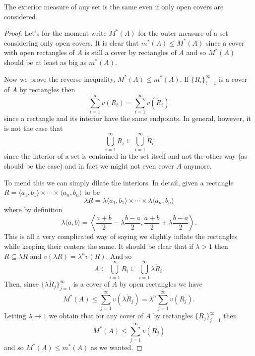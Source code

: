 \documentclass[12pt,oneside]{book}
\numberwithin{table}{section}
\numberwithin{equation}{section}
\numberwithin{figure}{section}
\newcommand{\ext}[1]{m^* \! \left( #1 \right)}
\begin{document}
\begin{lemma} \label{lemma:exterior measure with open sets}
	The exterior measure of any set is the same even if only open covers are considered.
\end{lemma}
\begin{proof}
	Let's for the moment write \( M^*(A) \) for the outer measure of a set considering only open covers. It is clear that \( \ext{A} \leq M^*(A) \) since a cover with open rectangles of \( A \) is still a cover by rectangles of \( A \) and so \( M^\ast(A) \) should be at least as big as \( \ext{A} \).

	Now we prove the reverse inequality, \( M^\ast(A) \leq \ext{A} \). If \( \{ R_i \}_{i = 1}^{\infty} \) is a cover of \( A \) by rectangles then
	\begin{equation*}
		\sum_{i = 1}^{\infty} v(R_i) = \sum_{i = 1}^{\infty} v(\mathring{R}_i)  
	\end{equation*}
	since a rectangle and its interior have the same endpoints. In general, however, it is not the case that
	\begin{equation*}
		\bigcup_{i = 1}^{\infty} R_i \subseteq \bigcup_{i = 1}^{\infty} \mathring{R}_i
	\end{equation*}
	since the interior of a set is contained in the set itself and not the other way (as should be the case) and in fact we might not even cover \( A \) anymore.

	To mend this we can simply dilate the interiors. In detail, given a rectangle \( R = \langle a_1, b_1 \rangle \times \cdots \times \langle a_n,b_n \rangle \) to be
	\begin{equation*}
		\lambda R = \lambda \langle a_1, b_1 \rangle \times \cdots \times \lambda \langle a_n,b_n \rangle
	\end{equation*}
	where by definition
	\begin{equation*}
		\lambda \langle a, b \rangle = \left\langle \frac{a+b}{2} - \lambda \frac{b - a}{2}, \frac{a + b}{2} + \lambda\frac{b - a}{2} \right\rangle.
	\end{equation*}
	This is all a very complicated way of saying we slightly inflate the rectangles while keeping their centers the same. It should be clear that if \( \lambda > 1 \) then \( R \subseteq \lambda \mathring{R} \) and \( v(\lambda R) = \lambda^n v(R) \). And so
	\begin{equation*}
		A \subseteq \bigcup_{i = 1}^{\infty} R_i \subseteq \bigcup_{i = 1}^{\infty} \lambda \mathring{R}_i.
	\end{equation*}
	Then, since \( \{ \lambda \mathring{R}_j \}_{j = 1}^{\infty} \) is a cover of \( A \) by open rectangles we have
	\begin{equation*}
		M^*(A) \leq \sum_{j = 1}^{\infty} v(\lambda \mathring{R}_j) = \lambda^n \sum_{j = 1}^{\infty} v(R_j).
	\end{equation*}
	Letting \( \lambda \to 1 \) we obtain that for any cover of \( A \) by rectangles \( \{ R_j \}_{j = 1}^\infty \) then
	\begin{equation*}
		M^*(A) \leq \sum_{j = 1}^{\infty} v(R_j)
	\end{equation*}
	and so \( M^*(A) \leq \ext{A} \) as we wanted.
\end{proof}
\end{document}
